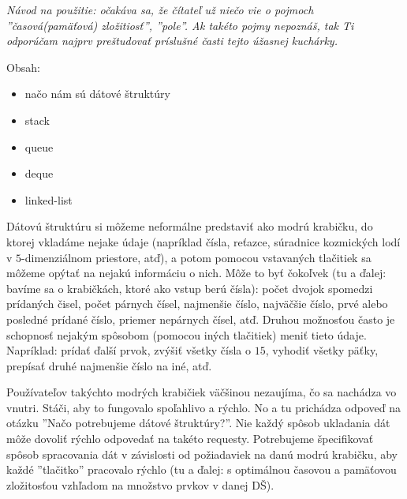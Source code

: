 



\textit{Návod na použitie: očakáva sa, že čítateľ už niečo vie o pojmoch 
''časová(pamäťová) zložitiosť'', ''pole''. Ak takéto
pojmy nepoznáš, tak Ti odporúčam najprv preštudovať príslušné časti tejto 
úžasnej kuchárky.}


Obsah:
\begin{itemize}
    \item načo nám sú dátové štruktúry
    \item stack    
    \item queue
    \item deque
    \item linked-list
\end{itemize}

\medskip

Dátovú štruktúru si môžeme neformálne predstaviť ako modrú krabičku, do ktorej 
vkladáme nejake údaje (napríklad čísla, reťazce, súradnice kozmických lodí v 
$5$-dimenziálnom priestore, atď), a potom pomocou vstavaných tlačitiek sa 
môžeme opýtať na nejakú informáciu o nich. Môže to byť čokoľvek (tu a ďalej: 
bavíme sa o krabičkách, ktoré ako vstup berú čísla): počet dvojok spomedzi 
prídaných čisel, počet párnych čísel, najmenšie číslo, najväčšie číslo, prvé 
alebo posledné prídané číslo, priemer nepárnych čísel, atď.
Druhou možnosťou často je schopnosť nejakým spôsobom (pomocou iných tlačitiek) 
meniť tieto údaje. Napríklad: prídať ďalší prvok, zvýšiť všetky čísla o $15$, 
vyhodiť všetky päťky, prepísať druhé najmenšie číslo na iné, atď. 

Používateľov takýchto modrých krabičiek väčšinou nezaujíma, čo sa nachádza vo 
vnutri. Stáči, aby to fungovalo spoľahlivo a rýchlo. No a tu prichádza odpoveď na 
otázku ''Načo potrebujeme dátové štruktúry?''. Nie každý spôsob ukladania dát 
môže dovoliť rýchlo odpovedať na takéto requesty. Potrebujeme špecifikovať spôsob 
spracovania dát v závislosti od požiadaviek na danú modrú krabičku, aby každé 
''tlačitko'' pracovalo rýchlo (tu a ďalej: s optimálnou časovou a pamäťovou 
zložitosťou vzhľadom na množstvo prvkov v danej DŠ).


